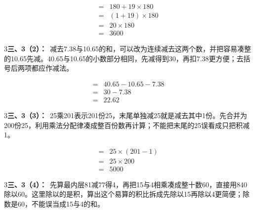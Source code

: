\documentclass[multi=snippet,border={5bp 20bp 5bp 5bp}]{standalone}
\newenvironment{snippet}[3]{\begin{minipage}{#1bp}\color{answerred}\fontsize{#2}{#3}\selectfont\raggedright}{\end{minipage}}
\begin{document}
\begin{snippet}{199.567}{10.5}{12.8}\SourceSans\setlength{\mathindent}{2bp}\[\begin{aligned}={}&180+19\times180\\={}&(1+19)\times180\\={}&20\times180\\={}&3600\end{aligned}\]\end{snippet}
\begin{snippet}{505}{11.5}{14}\begin{multicols}{3}\raggedcolumns \textbf{三、3（2）：}\ 减去7.38与10.65的和，可以改为连续减去这两个数，并把容易凑整的10.65先减。40.65与10.65的小数部分相同，先减得到30，再扣7.38更方便；去括号后两项都应作减法。\end{multicols}\end{snippet}
\begin{snippet}{191.233}{10.5}{12.8}\SourceSans\setlength{\mathindent}{2bp}\[\begin{aligned}={}&40.65-10.65-7.38\\={}&30-7.38\\={}&22.62\end{aligned}\]\end{snippet}
\begin{snippet}{505}{11.5}{14}\begin{multicols}{3}\raggedcolumns \textbf{三、3（3）：}\ 25乘201表示201份25，末尾单独减25就是减去其中1份。先合并为200份25，利用乘法分配律凑成整百份数再计算；不能把末尾的25误看成只把积减1。\end{multicols}\end{snippet}
\begin{snippet}{200.067}{10.5}{12.8}\SourceSans\setlength{\mathindent}{2bp}\[\begin{aligned}={}&25\times(201-1)\\={}&25\times200\\={}&5000\end{aligned}\]\end{snippet}
\begin{snippet}{505}{11.5}{14}\begin{multicols}{3}\raggedcolumns \textbf{三、3（4）：}\ 先算最内层81减77得4，再把15与4相乘凑成整十数60，直接用840除以60。这里除以的是积，算出这个易算的积比拆成先除以15再除以4更简便；除数是60，不能误当成15与4的和。\end{multicols}\end{snippet}
\end{document}
